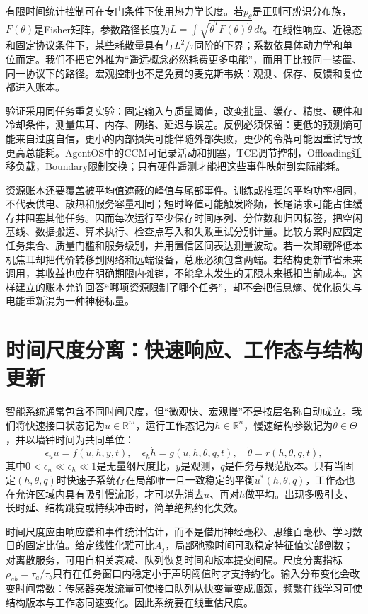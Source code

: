 有限时间统计控制可在专门条件下使用热力学长度。若$p_\theta$是正则可辨识分布族，$F(\theta)$是Fisher矩阵，参数路径长度为$L=\int\sqrt{\dot\theta^TF(\theta)\dot\theta}\,dt$。在线性响应、近稳态和固定协议条件下，某些耗散量具有与$L^2/\tau$同阶的下界；系数依具体动力学和单位而定。我们不把它外推为“遥远概念必然耗费更多电能”，而用于比较同一装置、同一协议下的路径。宏观控制也不是免费的麦克斯韦妖：观测、保存、反馈和复位都进入账本。

验证采用同任务重复实验：固定输入与质量阈值，改变批量、缓存、精度、硬件和冷却条件，测量焦耳、内存、网络、延迟与误差。反例必须保留：更低的预测熵可能来自过度自信，更小的内部损失可能伴随外部失败，更少的令牌可能因重试导致更高总能耗。AgentOS中的CCM可记录活动和拥塞，TCE调节控制，Offloading迁移负载，Boundary限制交换；只有硬件遥测才能把这些事件映射到实际能耗。

资源账本还要覆盖被平均值遮蔽的峰值与尾部事件。训练或推理的平均功率相同，不代表供电、散热和服务容量相同；短时峰值可能触发降频，长尾请求可能占住缓存并阻塞其他任务。因而每次运行至少保存时间序列、分位数和归因标签，把空闲基线、数据搬运、算术执行、检查点写入和失败重试分别计量。比较方案时应固定任务集合、质量门槛和服务级别，并用置信区间表达测量波动。若一次卸载降低本机焦耳却把代价转移到网络和远端设备，总账必须包含两端。若结构更新节省未来调用，其收益也应在明确期限内摊销，不能拿未发生的无限未来抵扣当前成本。这样建立的账本允许回答“哪项资源限制了哪个任务”，却不会把信息熵、优化损失与电能重新混为一种神秘标量。

\section{时间尺度分离：快速响应、工作态与结构更新}
\label{sec:section_3114}

智能系统通常包含不同时间尺度，但“微观快、宏观慢”不是按层名称自动成立。我们将快速接口状态记为$u\in\mathbb R^m$，运行工作态记为$h\in\mathbb R^n$，慢速结构参数记为$\theta\in\Theta$，并以墙钟时间为共同单位：
\begin{equation}
\epsilon_u\dot u=f(u,h,y,t),\quad \epsilon_h\dot h=g(u,h,\theta,q,t),\quad \dot\theta=r(h,\theta,q,t),
\end{equation}
其中$0<\epsilon_u\ll\epsilon_h\ll1$是无量纲尺度比，$y$是观测，$q$是任务与规范版本。只有当固定$(h,\theta,q)$时快速子系统存在局部唯一且一致稳定的平衡$u^*(h,\theta,q)$，工作态也在允许区域内具有吸引慢流形，才可以先消去$u$、再对$h$做平均。出现多吸引支、长时延、结构跳变或持续冲击时，简单绝热约化失效。

时间尺度应由响应谱和事件统计估计，而不是借用神经毫秒、思维百毫秒、学习数日的固定比值。给定线性化雅可比$A_j$，局部弛豫时间可取稳定特征值实部倒数；对离散服务，可用自相关衰减、队列恢复时间和版本提交间隔。尺度分离指标$\rho_{ab}=\tau_a/\tau_b$只有在任务窗口内稳定小于声明阈值时才支持约化。输入分布变化会改变时间常数：传感器突发流量可使接口队列从快变量变成瓶颈，频繁在线学习可使结构版本与工作态同速变化。因此系统要在线重估尺度。

